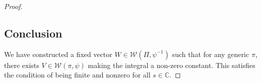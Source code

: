 \documentclass[12pt]{article}
\theoremstyle{plain}
\theoremstyle{definition}
\begin{document}
\begin{proof}
\subsection*{Conclusion}
We have constructed a fixed vector $W \in \mathcal{W}(\Pi, \psi^{-1})$ such that for any generic $\pi$, there exists $V \in \mathcal{W}(\pi, \psi)$ making the integral a non-zero constant. This satisfies the condition of being finite and nonzero for all $s \in \mathbb{C}$.
\end{proof}
\end{document}
